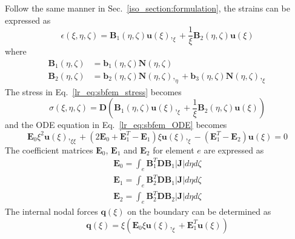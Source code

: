 %
Follow the same manner in Sec.~\ref{iso_section:formulation}, the strains can be expressed as
\begin{equation}
    \epsilon(\xi, \eta, \zeta) =
    \mathbf{B}_1 (\eta, \zeta) \mathbf{u} (\xi),_\xi +
    \frac{1}{\xi} \mathbf{B}_2 (\eta, \zeta) \mathbf{u} (\xi)
\end{equation}
%
where
\begin{subequations}
\begin{align}
    \mathbf{B}_1 (\eta, \zeta) & =
    \mathbf{b}_1 (\eta, \zeta) \mathbf{N} (\eta, \zeta) \\
    \mathbf{B}_2 (\eta, \zeta) & =
    \mathbf{b}_2 (\eta, \zeta) \mathbf{N} (\eta, \zeta),_\eta +
    \mathbf{b}_3 (\eta, \zeta) \mathbf{N} (\eta, \zeta),_\xi
\end{align}
\end{subequations}
%
The stress in Eq.~\ref{lr_eq:sbfem_stress} becomes
\begin{equation}
    \sigma(\xi, \eta, \zeta) = \mathbf{D} \left(
        \mathbf{B}_1 (\eta, \zeta) \mathbf{u} (\xi),_\xi +
        \frac{1}{\xi} \mathbf{B}_2 (\eta, \zeta) \mathbf{u} (\xi)
    \right)
\end{equation}
%
and the ODE equation in Eq.~\ref{lr_eq:sbfem_ODE} becomes
\begin{equation}
    \mathbf{E}_0 \xi^2 \mathbf{u}(\xi),_{\xi\xi} +
    (2\mathbf{E}_0 + \mathbf{E}_1^T - \mathbf{E}_1)\xi \mathbf{u}(\xi),_{\xi} -
    (\mathbf{E}_1^T - \mathbf{E}_2) \mathbf{u}(\xi)
    = 0
\label{oct_eq:sbfem_ode}
\end{equation}
%
The coefficient matrices $\mathbf{E}_0$, $\mathbf{E}_1$ and $\mathbf{E}_2$ for element $e$ are expressed as
\begin{subequations}
\begin{align}
    \mathbf{E}_0 = \int_e \mathbf{B}_1^T \mathbf{D} \mathbf{B}_1 |\mathbf{J}| d\eta d\zeta \\
    \mathbf{E}_1 = \int_e \mathbf{B}_2^T \mathbf{D} \mathbf{B}_1 |\mathbf{J}| d\eta d\zeta \\
    \mathbf{E}_2 = \int_e \mathbf{B}_2^T \mathbf{D} \mathbf{B}_2 |\mathbf{J}| d\eta d\zeta 
\end{align}
\end{subequations}
%
The internal nodal forces $\mathbf{q}(\xi)$ on the boundary can be determined as \citep{Son2004a}
\begin{equation}
    \mathbf{q} (\xi) = \xi (
        \mathbf{E}_0 \xi \mathbf{u}(\xi),_\xi +
        \mathbf{E}_1^T \mathbf{u}(\xi)
    )
\label{oct_eq:sbfem_nodal_forces}
\end{equation}
